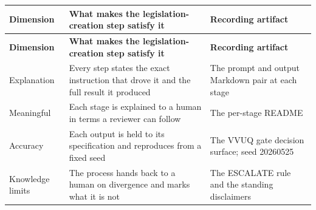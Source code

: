 {\footnotesize
\begin{xltabular}{\textwidth}{@{}L{2.5cm} Y L{3.4cm}@{}}
\hline
\textbf{Dimension} & \textbf{What makes the legislation-creation step satisfy it}
& \textbf{Recording artifact}\\
\hline
\endfirsthead
\hline
\textbf{Dimension} & \textbf{What makes the legislation-creation step satisfy it}
& \textbf{Recording artifact}\\
\hline
\endhead
\hline
\endlastfoot
Explanation & Every step states the exact instruction that drove it and the full
result it produced & The prompt and output Markdown pair at each stage\\
\hline
Meaningful & Each stage is explained to a human in terms a reviewer can follow &
The per-stage README\\
\hline
Accuracy & Each output is held to its specification and reproduces from a fixed
seed & The VVUQ gate decision surface; seed 20260525\\
\hline
Knowledge limits & The process hands back to a human on divergence and marks what
it is not & The ESCALATE rule and the standing disclaimers\\
\hline
\end{xltabular}}
